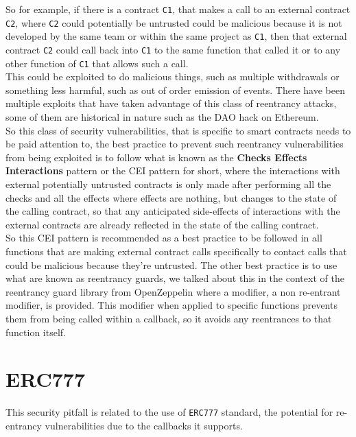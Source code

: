 So for example, if there is a contract \texttt{C1}, that makes a call to an external contract \texttt{C2}, where \texttt{C2} could potentially be untrusted could be malicious because it is not developed by the same team or within the same project as \texttt{C1}, then that external contract \texttt{C2} could call back into \texttt{C1} to the same function that called it or to any other function of \texttt{C1} that allows such a call.\\ 

This could be exploited to do malicious things, such as multiple withdrawals or something less harmful, such as out of order emission of events. There have been multiple exploits that have taken advantage of this class of reentrancy attacks, some of them are historical in nature such as the DAO hack on Ethereum.\\

So this class of security vulnerabilities, that is specific to smart contracts needs to be paid attention to, the best practice to prevent such reentrancy vulnerabilities from being exploited is to follow what is known as the \textbf{Checks Effects Interactions} pattern or the CEI pattern for short, where the interactions with external potentially untrusted contracts is only made after performing all the checks and all the effects where effects are nothing, but changes to the state of the calling contract, so that any anticipated side-effects of interactions with the external contracts are already reflected in the state of the calling contract.\\

So this CEI pattern is recommended as a best practice to be followed in all functions that are making external contract calls specifically to contact calls that could be malicious because they're untrusted. The other best practice is to use what are known as reentrancy guards, we talked about this in the context of the reentrancy guard library from OpenZeppelin where a modifier, a non re-entrant modifier, is provided. This modifier when applied to specific functions prevents them from being called within a callback, so it avoids any reentrances to that function itself.

\section{ERC777}

This security pitfall is related to the use of \texttt{ERC777} standard, the potential for re-entrancy vulnerabilities due to the callbacks it supports. \\

